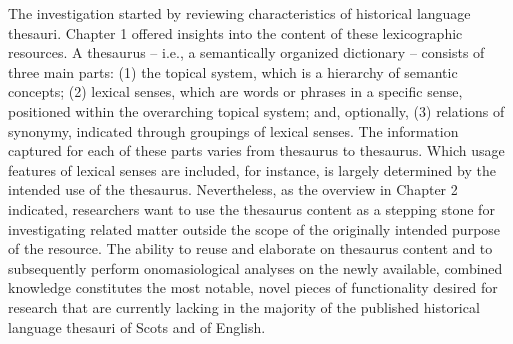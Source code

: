 \begin{comment}
The main question of my research is formulated as follows:
How can Web-based dissemination of thesauri of historical languages, and thesauri in general, be improved so as to answer to the research needs of scholars in various disciplines? This overarching research question is covered by three sub questions on historical language thesauri:
\begin{enumerate}
\item What are the main components found in these thesauri?
\item What are the main features, or functionality, of these thesauri that are desired for research?
\item What digital form should these thesauri be published in on the Web – and what modifications to current specifications ought to be implemented for this purpose – to support a wider use of historical language thesauri in academia?
\end{enumerate}
The questions above are addressed in Part I and II of the dissertation. The answers and hypotheses yielded are subsequently adopted and evaluated, in Part III, through their application to the historical language thesaurus TOE.
\end{comment}

The investigation started by reviewing characteristics of historical language thesauri. 
Chapter 1 offered insights into the content of these lexicographic resources. A thesaurus -- i.e., a semantically organized dictionary -- consists of three main parts: (1) the topical system, which is a hierarchy of semantic concepts; (2) lexical senses, which are words or phrases in a specific sense, positioned within the overarching topical system; and, optionally, (3) relations of synonymy, indicated through groupings of lexical senses. The information captured for each of these parts varies from thesaurus to thesaurus. Which usage features of lexical senses are included, for instance, is largely determined by the intended use of the thesaurus. Nevertheless, as the overview in Chapter 2 %
indicated, researchers want to use the thesaurus content as a stepping stone for investigating related matter outside the scope of the originally intended purpose of the resource. The ability to reuse and elaborate on thesaurus content and to subsequently perform onomasiological analyses on the newly available, combined knowledge constitutes the most notable, novel pieces of functionality desired for research that are currently lacking in the majority of the published historical language thesauri of Scots and of English.

